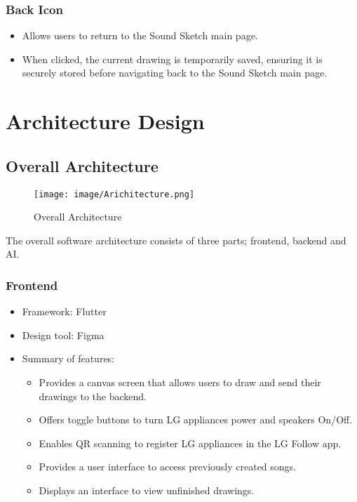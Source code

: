 \documentclass[conference]{IEEEtran}
\begin{document}
\subsubsection{Back Icon}
\begin{itemize}
    \item Allows users to return to the Sound Sketch main page.\\
    \item When clicked, the current drawing is temporarily saved, ensuring it is securely stored before navigating back to the Sound Sketch main page.\\
\end{itemize}

\section{Architecture Design}

\subsection{Overall Architecture}

\begin{figure}[h!]
    \centering
    \texttt{[image: image/Arichitecture.png]}
    \caption{Overall Architecture}
    \label{fig:enter-label}
\end{figure}

 \noindent The overall software architecture consists of three parts; frontend, backend and AI.\\

 \subsubsection{Frontend}
 \begin{itemize}
     \item Framework: Flutter\\
     \item Design tool: Figma
     \item Summary of features:
\begin{itemize}
    \item Provides a canvas screen that allows users to draw and send their drawings to the backend.\\
    \item Offers toggle buttons to turn LG appliances power and speakers On/Off.\\
    \item Enables QR scanning to register LG appliances in the LG Follow app.\\
    \item Provides a user interface to access previously created songs.\\
    \item Displays an interface to view unfinished drawings.\\
\end{itemize}
 \end{itemize}
\end{document}

